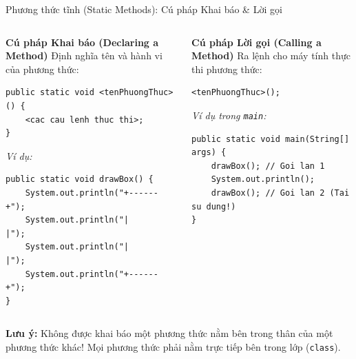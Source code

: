 \documentclass[aspectratio=169, 10pt]{beamer}
\begin{document}
\begin{frame}[fragile]{Phương thức tĩnh (Static Methods): Cú pháp Khai báo \& Lời gọi}
  \begin{columns}[t]
    \begin{block}{\textbf{Cú pháp Khai báo (Declaring a Method)}}
      Định nghĩa tên và hành vi của phương thức:
      \begin{lstlisting}
public static void <tenPhuongThuc>() {
    <cac cau lenh thuc thi>;
}
      \end{lstlisting}
      \textit{Ví dụ:}
      \begin{lstlisting}
public static void drawBox() {
    System.out.println("+------+");
    System.out.println("|      |");
    System.out.println("|      |");
    System.out.println("+------+");
}
      \end{lstlisting}
    \end{block}

    \begin{block}{\textbf{Cú pháp Lời gọi (Calling a Method)}}
      Ra lệnh cho máy tính thực thi phương thức:
      \begin{lstlisting}
<tenPhuongThuc>();
      \end{lstlisting}
      \textit{Ví dụ trong \texttt{main}:}
      \begin{lstlisting}
public static void main(String[] args) {
    drawBox(); // Goi lan 1
    System.out.println();
    drawBox(); // Goi lan 2 (Tai su dung!)
}
      \end{lstlisting}
    \end{block}
  \end{columns}

  \vspace{1mm}
  \begin{alertblock}{\textbf{Lưu ý:}}
    Không được khai báo một phương thức nằm bên trong thân của một phương thức khác! Mọi phương thức phải nằm trực tiếp bên trong lớp (\texttt{class}).
  \end{alertblock}
\end{frame}
\end{document}
